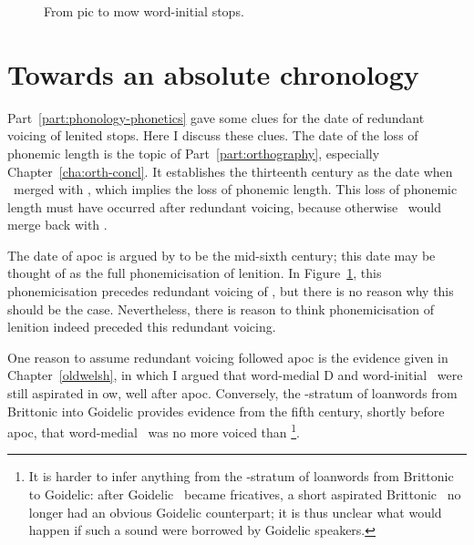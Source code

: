 \begin{figure}[h]
  \caption{From \gls{pic} to \gls{mow} word-initial stops.}
  \label{fig:pctomowstops}
\end{figure}


\section{Towards an absolute chronology}
\label{sec:towards-more-precise}
Part~\ref{part:phonology-phonetics} gave some clues for the date of redundant voicing of lenited stops. Here I discuss these clues. The date of the loss of phonemic length is the topic of Part~\ref{part:orthography}, especially Chapter~\ref{cha:orth-concl}. It establishes the thirteenth century as the date when \lT\ merged with \xD, which implies the loss of phonemic length. This loss of phonemic length must have occurred after redundant voicing, because otherwise \lT\ would merge back with \xT.

The date of \gls{apoc} is argued by \textcite[§~182]{jackson_language_1953} to be the mid-sixth century; this date may be thought of as the full phonemicisation of lenition. In Figure~\ref{fig:pctomowstops}, this phonemicisation precedes redundant voicing of \lT, but there is no  reason why this should be the case. Nevertheless, there is reason to think phonemicisation of lenition indeed preceded this redundant voicing. 

One reason to assume redundant voicing followed \gls{apoc} is the evidence given in Chapter~\ref{oldwelsh}, in which I argued that word-medial \gls{D} and word-initial \lT\ were still aspirated in \gls{ow}, well after \gls{apoc}. Conversely, the -stratum of loanwords from Brittonic into Goidelic provides evidence from the fifth century, shortly before \gls{apoc}, that word-medial \lT\ was no more voiced than \xT\footnote{It is harder to infer anything from the -stratum of loanwords from Brittonic to Goidelic: after Goidelic \lT\ became fricatives, a short aspirated Brittonic \lT\ no longer had an obvious Goidelic counterpart; it is thus unclear what would happen if such a sound were borrowed by Goidelic speakers.}. 

